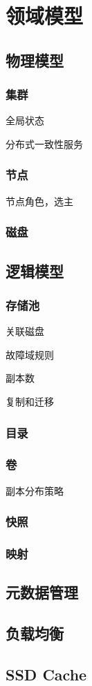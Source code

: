 \chapter{领域模型}

\section{物理模型}

\subsection{集群}

全局状态

分布式一致性服务

\subsection{节点}

节点角色，选主

\subsection{磁盘}

\section{逻辑模型}

\subsection{存储池}

关联磁盘

故障域规则

副本数

复制和迁移

\subsection{目录}

\subsection{卷}

副本分布策略

\subsection{快照}

\subsection{映射}

\section{元数据管理}
\section{负载均衡}
\section{SSD Cache}
